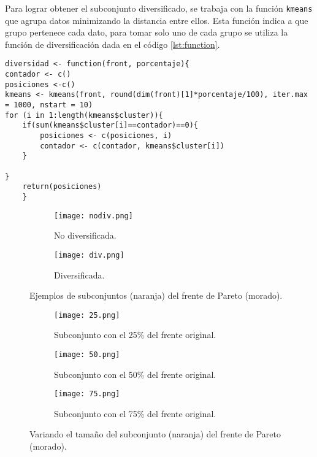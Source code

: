 \documentclass[12pt,letterpaper]{article}
\begin{document}
Para lograr obtener el subconjunto diversificado, se trabaja con la función \texttt{kmeans} \cite{kmeans} que agrupa datos minimizando la distancia entre ellos. Esta función indica a que grupo pertenece cada dato, para tomar solo uno de cada grupo se utiliza la función de diversificación dada en el código \ref{lst:function}.

\begin{lstlisting}[caption = Función de diversificación., label={lst:function}]
diversidad <- function(front, porcentaje){
contador <- c()
posiciones <-c()
kmeans <- kmeans(front, round(dim(front)[1]*porcentaje/100), iter.max = 1000, nstart = 10)
for (i in 1:length(kmeans$cluster)){
    if(sum(kmeans$cluster[i]==contador)==0){
        posiciones <- c(posiciones, i)
        contador <- c(contador, kmeans$cluster[i])
    }
    
}
    return(posiciones)
    }
\end{lstlisting}

 \begin{figure}
 	\centering 
 	\begin{subfigure}[b]{0.47\linewidth}
 		\texttt{[image: nodiv.png]} 		
 		\caption{No diversificada.}
 		 		\label{1}
 	\end{subfigure}  \hfill
 	\begin{subfigure}[b]{0.47\linewidth}
 		\texttt{[image: div.png]} 		
 		\caption{Diversificada.}
 		\label{2}
 	\end{subfigure} 
 	 	\label{ex}
 	\caption{Ejemplos de subconjuntos (naranja) del frente de Pareto (morado).}
\end{figure} 

\begin{figure}
 	\centering 
 	\begin{subfigure}[b]{0.3\linewidth}
 		\texttt{[image: 25.png]} 		
 		\caption{Subconjunto con el 25\% del frente original.}
 		 		\label{25}
 	\end{subfigure}  \hfill
 	\begin{subfigure}[b]{0.3\linewidth}
 		\texttt{[image: 50.png]} 		
 		\caption{Subconjunto con el 50\% del frente original.}
 		\label{50}
 	\end{subfigure} \hfill
 	\begin{subfigure}[b]{0.3\linewidth}
 		\texttt{[image: 75.png]} 		
 		\caption{Subconjunto con el 75\% del frente original.}
 		\label{75}
 	\end{subfigure} 
 	 	\label{por}
 	\caption{Variando el tamaño del subconjunto (naranja) del frente de Pareto (morado).}
\end{figure} 
 

\end{document}
